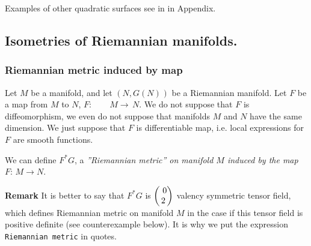 \documentclass[12pt]{article}
\theoremstyle{theorem}
\numberwithin{equation}{section}
\begin{document}





  Examples of other quadratic 
surfaces see in in Appendix.


\subsection {Isometries of Riemannian manifolds.}

\subsubsection {Riemannian metric induced by map}

Let $M$ be a manifold, and let $(N,G(N)^{})$ 
be a Riemannian manifold.
Let $F$ be a map from $M$ to $N$,
         $
F\colon \qquad  M\longrightarrow\, N
         $.
We do not suppose that $F$ is diffeomorphism, we 
even do not suppose that manifolds $M$ and $N$
have the same dimension. We just suppose that
$F$ is differentiable map, i.e. local expressions
for $F$ are smooth functions.

  We can define $F^*G$,  a {\it ''Riemannian metric''  on
manifold $M$ induced by the map $F\colon\, M\to N$}.

{\footnotesize

{\bf Remark}   It is better to say that $F^*G$
is $\begin{pmatrix}\ 0 \cr 2\cr \end{pmatrix}$ valency
symmetric tensor field, which  defines Riemannian metric
on manifold $M$ in the case if this tensor field
is positive definite (see counterexample  
 below).  It is why we put  
the expression 
 {\tt Riemannian metric} in 
 quotes.
}
\smallskip
\end{document}
